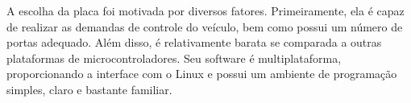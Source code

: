 \begin{itemize}
  \newpage

  A escolha da placa foi motivada por diversos fatores.
  Primeiramente, ela é capaz de realizar as demandas de controle do
  veículo, bem como possui um número de portas adequado. Além disso,
  é relativamente barata se comparada a outras plataformas de
  microcontroladores. Seu software é multiplataforma, proporcionando
  a interface com o Linux e possui um ambiente de programação simples,
  claro e bastante familiar.


  \end{itemize}
